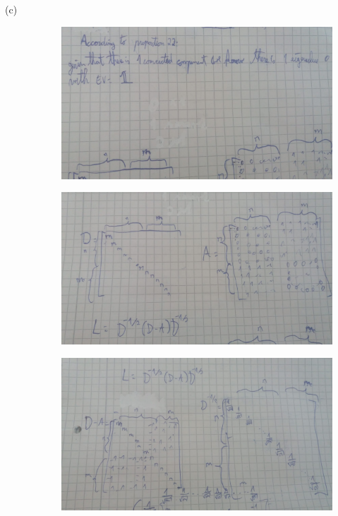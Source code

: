 \documentclass[14pt]{article}
\begin{document}
\begin{description}
\item[(c)]
\begin{figure}[h]
  \includegraphics[scale=0.3]{a10-ex1-c1.jpeg}
\end{figure}
\begin{figure}[h]
  \includegraphics[scale=0.3]{a10-ex1-c2.jpeg}
\end{figure}
\begin{figure}[h]
  \includegraphics[scale=0.3]{a10-ex1-c3.jpeg}

\end{figure}
\end{description}
\end{document}
